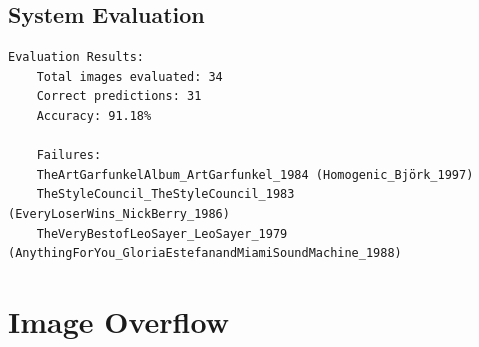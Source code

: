 \begin{uomappendix}
            \subsection{System Evaluation}
    
                \begin{adjustbox}{max width=\textwidth}
                    \begin{lstlisting}[caption={Ouroboros model evaluation results on 34 images}, label={lst:ourobEval}]
    Evaluation Results:
    Total images evaluated: 34
    Correct predictions: 31
    Accuracy: 91.18%
    
    Failures:
    TheArtGarfunkelAlbum_ArtGarfunkel_1984 (Homogenic_Björk_1997)
    TheStyleCouncil_TheStyleCouncil_1983 (EveryLoserWins_NickBerry_1986)
    TheVeryBestofLeoSayer_LeoSayer_1979 (AnythingForYou_GloriaEstefanandMiamiSoundMachine_1988)
                    \end{lstlisting}
                \end{adjustbox}
    
        \section{Image Overflow}
    

\end{uomappendix}
